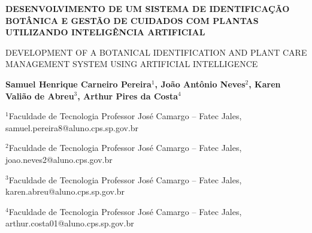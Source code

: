 \documentclass[12pt,a4paper]{article}
\begin{document}

\begin{center}
  {\fontsize{12pt}{14pt}\selectfont \textbf{DESENVOLVIMENTO DE UM SISTEMA DE IDENTIFICAÇÃO BOTÂNICA E GESTÃO DE CUIDADOS COM PLANTAS UTILIZANDO INTELIGÊNCIA ARTIFICIAL}\par}
  \vspace{0.3cm}
  {\fontsize{12pt}{14pt}\selectfont DEVELOPMENT OF A BOTANICAL IDENTIFICATION AND PLANT CARE MANAGEMENT SYSTEM USING ARTIFICIAL INTELLIGENCE\par}
  \vspace{0.4cm}
  
  {\fontsize{12pt}{14pt}\selectfont \textbf{Samuel Henrique Carneiro Pereira$^1$, João Antônio Neves$^2$, Karen Valião de Abreu$^3$, Arthur Pires da Costa$^4$}\par}
  \vspace{0.2cm}
  
  {\fontsize{10pt}{12pt}\selectfont 
  $^1$Faculdade de Tecnologia Professor José Camargo -- Fatec Jales, samuel.pereira8@aluno.cps.sp.gov.br\par
  $^2$Faculdade de Tecnologia Professor José Camargo -- Fatec Jales, joao.neves2@aluno.cps.gov.br\par
  $^3$Faculdade de Tecnologia Professor José Camargo -- Fatec Jales, karen.abreu@aluno.cps.sp.gov.br\par
  $^4$Faculdade de Tecnologia Professor José Camargo -- Fatec Jales, arthur.costa01@aluno.cps.sp.gov.br\par
  }
\end{center}

\vspace{0.2cm}
\vspace{0.4cm}
\end{document}
